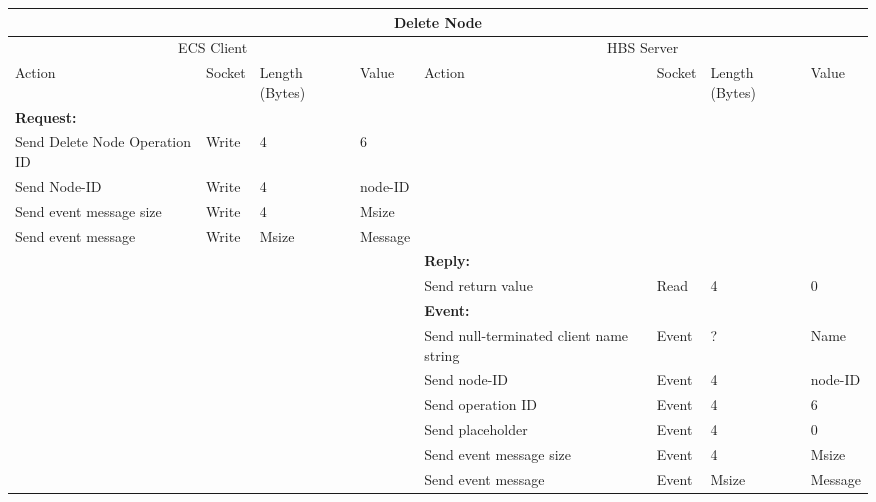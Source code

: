 \bigskip
\small
\begin{tabular}{|p{1.2in}|p{.4in}|p{.4in}|p{.5in}|p{1.2in}|p{.4in}|p{.4in}|p{.5in} |} \hline
\multicolumn{8}{|c|}{{\bf Delete Node}} \\ \hline
\multicolumn{4}{|c|}{ECS Client} & \multicolumn{4}{|c|}{HBS Server} \\ \hline
Action            & Socket & Length  
                            (Bytes)& Value & Action       & Socket & Length 
                                                                    (Bytes)& Value \\ \hline
\multicolumn{4}{|l}{{\bf Request:}}&\multicolumn{4}{|l|}{~} \\ \hline
Send Delete Node Operation ID  & Write  & 4     & 6     &              &        &       &       \\ \hline
Send Node-ID      & Write  & 4     &  node-ID &           &        &       &       \\ \hline
Send event
message size      & Write  & 4     &  Msize &         &        &       &       \\ \hline
Send event message
                  & Write  &  Msize  &  Message &     &        &       &       \\ \hline
\multicolumn{4}{|l}{~}&\multicolumn{4}{|l|}{{\bf Reply:}} \\ \hline
                  &        &       &       & Send return
                                             value        & Read   &  4    & 0       \\ \hline
\multicolumn{4}{|l}{~}&\multicolumn{4}{|l|}{{\bf Event:}} \\ \hline
                  &        &       &       & Send null-terminated client
                                             name string  & Event  &  ?    & Name  \\ \hline
                  &        &       &       & Send node-ID  & Event  &   4   &   node-ID    \\  \hline
                  &        &       &       & Send operation 
                                             ID           & Event  &   4   &  6   \\ \hline
                  &        &       &       & Send placeholder     & Event  &   4   &  0    \\ \hline
                  &        &       &       & Send event message
                                                  size    & Event  &   4   &  Msize \\ \hline
                  &        &       &       & Send event message
                                                          & Event  &  Msize&  Message  \\ \hline
\end{tabular}
\normalsize
\bigskip




